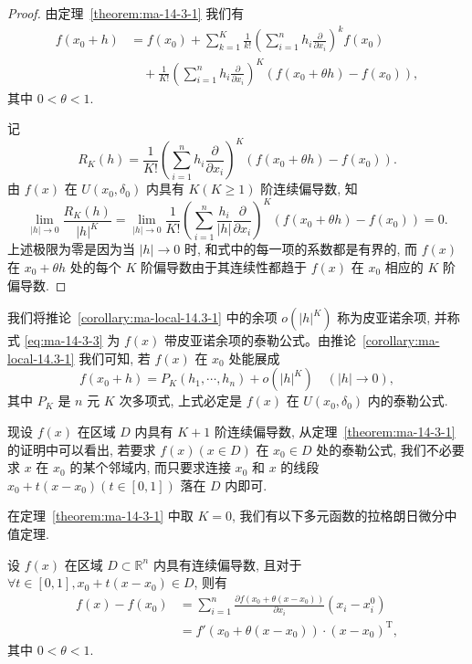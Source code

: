 \begin{proof}
由定理~\ref{theorem:ma-14-3-1} 我们有
\[
\begin{aligned}
  f(x_0+h)
  &=f(x_0)+\sum_{k=1}^K\frac1{k!}
  \left(\sum_{i=1}^n h_i\frac{\partial}{\partial x_i}\right)^kf(x_0)\\
  &\quad+\frac1{K!}
  \left(\sum_{i=1}^n h_i\frac{\partial}{\partial x_i}\right)^K
  (f(x_0+\theta h)-f(x_0)),
\end{aligned}
\]
其中 $0<\theta<1$.

记
\[
  R_K(h)=\frac1{K!}
  \left(\sum_{i=1}^n h_i\frac{\partial}{\partial x_i}\right)^K
  (f(x_0+\theta h)-f(x_0)).
\]
由 $f(x)$ 在 $U(x_0,\delta_0)$ 内具有 $K(K\geqslant1)$ 阶连续偏导数, 知
\[
  \lim_{|h|\to0}\frac{R_K(h)}{|h|^K}
  =\lim_{|h|\to0}\frac1{K!}
  \left(\sum_{i=1}^n\frac{h_i}{|h|}\frac{\partial}{\partial x_i}\right)^K
  (f(x_0+\theta h)-f(x_0))=0.
\]
上述极限为零是因为当 $|h|\to0$ 时, 和式中的每一项的系数都是有界的, 而 $f(x)$ 在 $x_0+\theta h$ 处的每个 $K$ 阶偏导数由于其连续性都趋于 $f(x)$ 在 $x_0$ 相应的 $K$ 阶偏导数.
\end{proof}


\begin{remark}\label{remark:ma-14-source-74}
我们将推论~\ref{corollary:ma-local-14.3-1} 中的余项 $o(|h|^K)$ 称为皮亚诺余项, 并称式 \eqref{eq:ma-14-3-3} 为 $f(x)$ 带皮亚诺余项的泰勒公式。由推论~\ref{corollary:ma-local-14.3-1} 我们可知, 若 $f(x)$ 在 $x_0$ 处能展成
\[
  f(x_0+h)=P_K(h_1,\cdots,h_n)+o(|h|^K)
  \quad(|h|\to0),
\]
其中 $P_K$ 是 $n$ 元 $K$ 次多项式, 上式必定是 $f(x)$ 在 $U(x_0,\delta_0)$ 内的泰勒公式.
\end{remark}

现设 $f(x)$ 在区域 $D$ 内具有 $K+1$ 阶连续偏导数, 从定理~\ref{theorem:ma-14-3-1} 的证明中可以看出, 若要求 $f(x)(x\in D)$ 在 $x_0\in D$ 处的泰勒公式, 我们不必要求 $x$ 在 $x_0$ 的某个邻域内, 而只要求连接 $x_0$ 和 $x$ 的线段 $x_0+t(x-x_0)(t\in[0,1])$ 落在 $D$ 内即可.

在定理~\ref{theorem:ma-14-3-1} 中取 $K=0$, 我们有以下多元函数的拉格朗日微分中值定理.

\begin{corollary}\label{corollary:ma-local-14.3-2}
设 $f(x)$ 在区域 $D\subset\mathbb R^n$ 内具有连续偏导数, 且对于 $\forall t\in[0,1],x_0+t(x-x_0)\in D$, 则有
\[
\begin{aligned}
  f(x)-f(x_0)
  &=\sum_{i=1}^n
  \frac{\partial f(x_0+\theta(x-x_0))}{\partial x_i}(x_i-x_i^0)\\
  &=f'(x_0+\theta(x-x_0))\cdot(x-x_0)^\mathrm T,
\end{aligned}
\]
其中 $0<\theta<1$.
\end{corollary}

